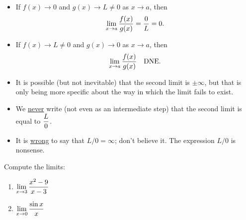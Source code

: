 

\begin{remark}\,
\begin{itemize}
\item If $f(x)\to 0$ and $g(x)\to L\ne 0$ as $x\to a$, then 
\begin{equation*}
\displaystyle\lim_{x\to a}\frac{f(x)}{g(x)} = \frac{0}{L} = 0.
\end{equation*}
\item If $f(x)\to L\ne 0$ and $g(x)\to 0$ as $x\to a$, then 
\begin{equation*}
\displaystyle\lim_{x\to a}\frac{f(x)}{g(x)} \quad \mathrm{DNE}.
\end{equation*}
\item It is possible (but not inevitable) that the second limit is $\pm\infty$, but that is only being more specific about the way in which the limit fails to exist.
\item We \underline{never} write (not even as an intermediate step) that the second limit is equal to $\displaystyle\frac{L}{0}$.
\item It is \underline{wrong} to say that $L/0 = \infty$; don't believe it.
The expression $L/0$ is nonsense.
\end{itemize}
\end{remark}

\begin{example}
Compute the limits:
\begin{enumerate}
\item $\displaystyle\lim_{x\to 3}\frac{x^2-9}{x-3}$
\ifdefined\SOLUTION
{}
\else
\fi
\vfill

\item $\displaystyle\lim_{x\to 0}\frac{\sin x}{x}$
\ifdefined\SOLUTION
{}
\else
\fi
\vfill
\end{enumerate}
\end{example}

\newpage

